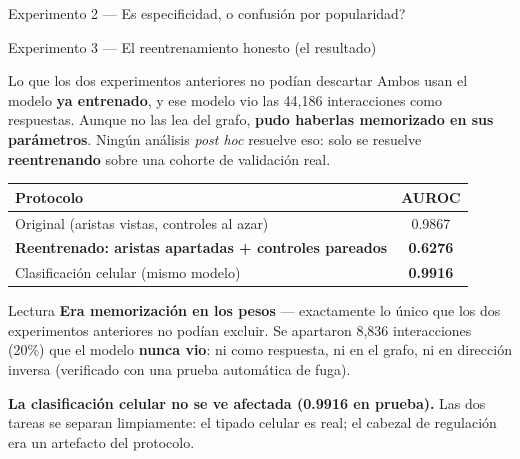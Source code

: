 \begin{frame}{Experimento 2 --- \textquestiondown{}Es especificidad, o confusi\'on por popularidad?}
\end{frame}

\begin{frame}{Experimento 3 --- El reentrenamiento honesto (el resultado)}
  \begin{block}{Lo que los dos experimentos anteriores no pod\'ian descartar}
    \scriptsize
    Ambos usan el modelo \textbf{ya entrenado}, y ese modelo vio las 44,186 interacciones como respuestas. Aunque no las lea del grafo, \textbf{pudo haberlas memorizado en sus par\'ametros}. Ning\'un an\'alisis \emph{post hoc} resuelve eso: solo se resuelve \textbf{reentrenando} sobre una cohorte de validaci\'on real.
  \end{block}

  \vspace{0.3em}
  \centering
  \small
  \begin{tabular}{lc}
    \toprule
    \textbf{Protocolo} & \textbf{AUROC} \\
    \midrule
    Original (aristas vistas, controles al azar) & 0.9867 \\
    \textbf{Reentrenado: aristas apartadas + controles pareados} & \textbf{0.6276} \\
    \midrule
    Clasificaci\'on celular (mismo modelo) & \textbf{0.9916} \\
    \bottomrule
  \end{tabular}

  \vspace{0.5em}
  \raggedright
  \begin{block}{Lectura}
    \scriptsize
    \textbf{Era memorizaci\'on en los pesos} --- exactamente lo \'unico que los dos experimentos anteriores no pod\'ian excluir. Se apartaron 8,836 interacciones (20\%) que el modelo \textbf{nunca vio}: ni como respuesta, ni en el grafo, ni en direcci\'on inversa (verificado con una prueba autom\'atica de fuga).

    \vspace{0.2em}
    \textbf{La clasificaci\'on celular no se ve afectada (0.9916 en prueba).} Las dos tareas se separan limpiamente: el tipado celular es real; el cabezal de regulaci\'on era un artefacto del protocolo.
  \end{block}
\end{frame}

